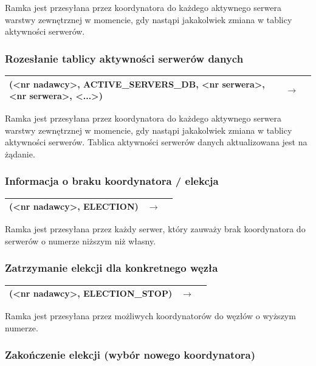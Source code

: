 Ramka jest przesyłana przez koordynatora do każdego aktywnego serwera warstwy zewnętrznej w momencie, gdy nastąpi jakakolwiek zmiana w tablicy aktywności serwerów.

\subsubsection{Rozesłanie tablicy aktywności serwerów danych}

\begin{longtable}{| p{} | p{}| p{} |} 
\hline
(<nr nadawcy>, ACTIVE\_SERVERS\_DB, <nr serwera>, <nr serwera>, <...>) & $\rightarrow$ &  \\ \hline
\end{longtable}

Ramka jest przesyłana przez koordynatora do każdego aktywnego serwera warstwy zewnętrznej w momencie, gdy nastąpi jakakolwiek zmiana w tablicy aktywności serwerów. Tablica aktywności serwerów danych aktualizowana jest na żądanie.

\subsubsection{Informacja o braku koordynatora / elekcja}

\begin{longtable}{| p{} | p{}| p{} |} 
\hline
(<nr nadawcy>, ELECTION) & $\rightarrow$ &  \\ \hline
\end{longtable}

Ramka jest przesyłana przez każdy serwer, który zauważy brak koordynatora do serwerów o numerze niższym niż własny.

\subsubsection{Zatrzymanie elekcji dla konkretnego węzła}

\begin{longtable}{| p{} | p{}| p{} |} 
\hline
(<nr nadawcy>, ELECTION\_STOP) & $\rightarrow$ &  \\ \hline
\end{longtable}

Ramka jest przesyłana przez możliwych koordynatorów do węzłów o wyższym numerze.

\subsubsection{Zakończenie elekcji (wybór nowego koordynatora)}

